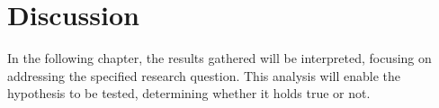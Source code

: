 \section{Discussion}
In the following chapter, the results gathered will be interpreted, focusing on addressing the specified research question. This analysis will enable the hypothesis to be tested, determining whether it holds true or not.

